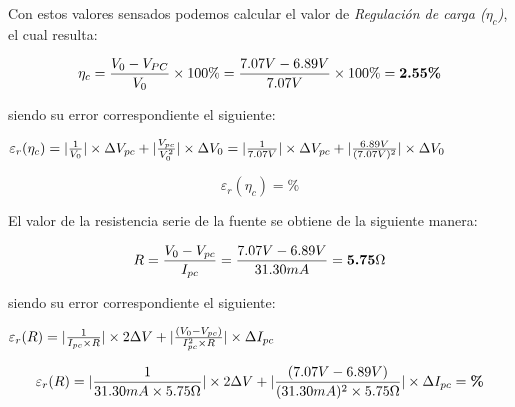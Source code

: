\documentclass{article}
\begin{document}
Con estos valores sensados podemos calcular el valor de \textit{Regulación de carga ($\eta_c$)}, el cual resulta:
\bigskip

\begin{equation}
 	\eta_c = {V_0 - V_{PC} \over V_0} \times 100\%  = {7.07V - 6.89V \over 7.07V} \times 100\% = \textbf{2.55\%}
\end{equation}
\bigskip


\noindent siendo su error correspondiente el siguiente:
\bigskip

\begin{center}
	$\varepsilon_r(\eta_c) = |{1 \over V_{0}}| \times \Delta V_{pc} + |{V_{pc} \over V_{0}^2}| \times \Delta V_{0} = |{1 \over 7.07V}| \times \Delta V_{pc} + |{6.89V \over (7.07V)^2}| \times \Delta V_{0}$ \\
\end{center}

\begin{equation}
	\varepsilon_r(\eta_c) = \textbf{\%}
\end{equation}

\bigskip\bigskip


El valor de la resistencia serie de la fuente se obtiene de la siguiente manera:
\bigskip

\begin{equation}
	R = {V_{0} - V_{pc} \over I_{pc}} = {7.07V - 6.89V \over 31.30mA} = \textbf{5.75$\Omega$} \\
\end{equation}
\bigskip


\noindent siendo su error correspondiente el siguiente:
\bigskip


\begin{center}
	$\varepsilon_r(R) = |{1\over I_{pc} \times R}|\times 2\Delta V + |{(V_{0}-V_{pc})  \over  I_{pc}^2  \times R}| \times \Delta I_{pc} $ \\
\end{center}

\begin{equation}
	\varepsilon_r(R) = |{1\over 31.30mA \times 5.75\Omega}|\times 2\Delta V + |{(7.07V-6.89V)  \over  (31.30mA)^2  \times 5.75\Omega}| \times \Delta I_{pc} = \textbf{\%} \\
\end{equation}
\bigskip\bigskip\bigskip
\end{document}
